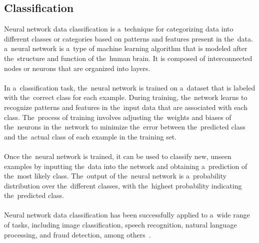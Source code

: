 \documentclass[12pt]{article}
\begin{document}
    \subsection{Classification} \label{subsec:clasification}
    Neural network data classification is a~technique for categorizing data into different classes or categories based on patterns and features present in the~data. a~neural network is a~type of machine learning algorithm that is modeled after the~structure and function of the~human brain. It is composed of interconnected nodes or neurons that are organized into layers.\\
    \\
    In a~classification task, the~neural network is trained on a~dataset that is labeled with the~correct
class for each example. During training, the~network learns to recognize patterns and features in the~input data
that are associated with each class. The~process of training involves adjusting the~weights and biases of the~neurons in the~network to minimize the~error between the~predicted class and the~actual class of each example in the training set.\\
    \\
    Once the~neural network is trained, it can be used to classify new, unseen examples by inputting the~data into the network and obtaining a~prediction of the~most likely class. The~output of the~neural network is a~probability distribution over the~different classes, with the~highest probability indicating the~predicted class.\\
    \\
    Neural network data classification has been successfully applied to a~wide range of tasks, including image
classification, speech recognition, natural language processing, and fraud detection, among others~\cite{feraud2002methodology}.
\end{document}
